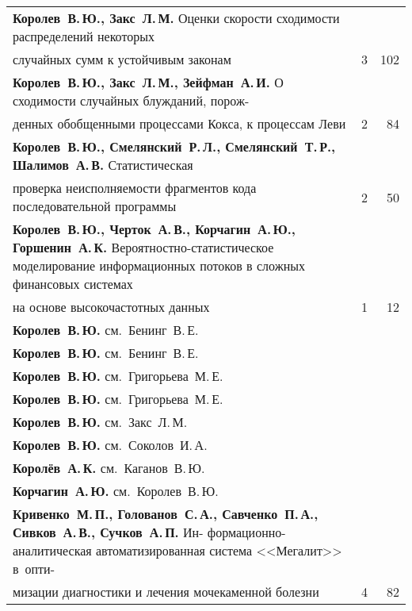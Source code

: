 {\begin{tabular}{p{388pt}rr}
\textbf{Королев~В.\,Ю., Закс~Л.\,М.}
Оценки скорости сходимости распределений некоторых\linebreak
\vspace*{-12pt}\\
\hspace*{23pt}случайных сумм к устойчивым законам\dotfill&3&102\\
\textbf{Королев~В.\,Ю., Закс~Л.\,М., Зейфман~А.\,И.}
О сходимости случайных блужданий, порож-\linebreak
\vspace*{-12pt}\\
\hspace*{23pt}денных обобщенными процессами Кокса, к процессам Леви\dotfill&2&84\\
\textbf{Королев~В.\,Ю., Смелянский~Р.\,Л., Смелянский~Т.\,Р.,
Шалимов~А.\,В.}
Статистическая\linebreak
\vspace*{-12pt}\\
\hspace*{23pt}проверка неисполняемости фрагментов кода последовательной
программы\dotfill&2&50\\
\hangindent=23pt\noindent\textbf{Королев~В.\,Ю., Черток~А.\,В., Корчагин~А.\,Ю., Горшенин~А.\,К.}
Вероятностно-ста\-ти\-сти\-че\-ское моделирование информационных потоков в сложных
финансовых системах\linebreak
\vspace*{-12pt}\\
\hspace*{23pt}на основе высокочастотных данных\dotfill&1&12\\
\textbf{Королев~В.\,Ю.} см.~Бенинг~В.\,Е.&&\\
\textbf{Королев~В.\,Ю.} см.~Бенинг~В.\,Е.&&\\
\textbf{Королев~В.\,Ю.} см.~Григорьева~М.\,Е.&&\\
\textbf{Королев~В.\,Ю.} см.~Григорьева~М.\,Е.&&\\
\textbf{Королев~В.\,Ю.} см.~Закс~Л.\,М.&&\\
\textbf{Королев~В.\,Ю.} см.~Соколов~И.\,А.&&\\
\textbf{Королёв~А.\,К.} см.~Каганов~В.\,Ю.&&\\
\textbf{Корчагин~А.\,Ю.} см.~Королев~В.\,Ю.&&\\
\hangindent=23pt\noindent\textbf{Кривенко~М.\,П., Голованов~С.\,А., 
Савченко~П.\,А., Сивков~А.\,В., Сучков~А.\,П.} Ин-\linebreak 
формационно-аналитическая автоматизированная система <<Мегалит>> в~опти-\linebreak
\vspace*{-12pt}\\
\hspace*{23pt}мизации диагностики и лечения мочекаменной
болезни\dotfill&4&82\\
\end{tabular}
}

